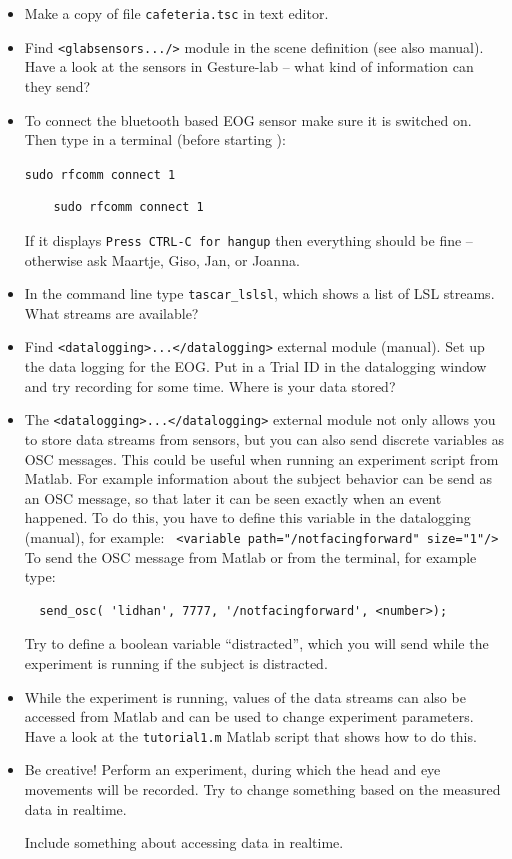 \documentclass[11pt,a4paper,twoside]{article}
\begin{document}
\begin{itemize}
\item Make a copy of file {\tt cafeteria.tsc} in text editor.

\item Find {\tt <glabsensors.../>} module in the scene definition
  (see also manual). Have a look at the sensors in Gesture-lab -- what kind
  of information can they send?

\item To connect the bluetooth based EOG sensor make sure it is switched on. Then type in a terminal (before starting \tascar{}):

  {\tt sudo rfcomm connect 1}
  
  \begin{lstlisting}
    sudo rfcomm connect 1\end{lstlisting}
    
    If it displays {\tt Press CTRL-C for hangup} then everything should be fine -- otherwise ask Maartje, Giso, Jan, or Joanna.

  \item In the command line type \verb!tascar_lslsl!, which shows a list
    of LSL streams. What streams are available?
  \item Find \verb!<datalogging>...</datalogging>! external module
    (manual).  Set up the data logging for the EOG. Put in a Trial ID in the datalogging window and try recording for some time. Where is your data stored?
  \item The \verb!<datalogging>...</datalogging>! external module not only allows you to store data streams from sensors, 
but you can also send discrete variables as OSC messages. 
This could be useful when running an experiment script from Matlab. 
%
For example information about the subject behavior can be send as an
OSC message, so that later it can be seen exactly when an event
happened.
%
To do this, you have to define this variable in the datalogging
(manual), for example:
\verb! <variable path="/notfacingforward" size="1"/>!  To send the OSC
message from Matlab or from the terminal, for example type:
\begin{lstlisting} 
  send_osc( 'lidhan', 7777, '/notfacingforward', <number>); 
\end{lstlisting}
Try to define a boolean variable ``distracted'', which you will send while the experiment is running if the subject is distracted.
\item While the experiment is running, values of the data streams can
  also be accessed from Matlab and can be used to change experiment
  parameters.
  Have a look at the \verb!tutorial1.m! Matlab script that shows how
  to do this.
\item Be creative! Perform an experiment, during which the head and
  eye movements will be recorded. Try to change something based on the
  measured data in realtime.

  Include something about accessing data in realtime.
\end{itemize}
\fi
\end{document}
